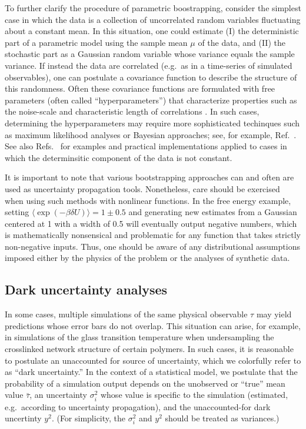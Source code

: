 To further clarify the procedure of parametric boostrapping, consider the simplest case in which the data is a collection of uncorrelated random variables fluctuating about a constant mean.  In this situation, one could estimate (I) the deterministic part of a parametric model using the sample mean $\mu$ of the data, and (II) the stochastic part as a Gaussian random variable whose variance equals the sample variance.  If instead the data are correlated (e.g.\ as in a time-series of simulated observables),  one can postulate a covariance function to describe the structure of this randomness.  Often these covariance functions are formulated with free parameters (often called ``hyperparameters'') that characterize properties such as the noise-scale and characteristic length of correlations \cite{Rasmussen}.  In such cases, determining the hyperparameters may require more sophisticated techinques such as maximum likelihood analyses or Bayesian approaches; see, for example, Ref.~\cite{Rasmussen}.  See also Refs.~\cite{patrone1,patrone2,patrone3,Boettinger2017} for examples and practical implementations applied to cases in which the determinsitic component of the data is not constant.

It is important to note that various bootstrapping approaches can and often are used as uncertainty propagation tools.  Nonetheless, care should be exercised when using such methods with nonlinear functions.  In the free energy example, setting $\langle \exp(-\beta \delta U)\rangle = 1 \pm 0.5$ and generating new estimates from a Gaussian centered at 1 with a width of 0.5 will eventually output negative numbers, which is mathematically nonsensical and problematic for any function that takes strictly non-negative inputs.  Thus, one should be aware of any distributional assumptions imposed either by the physics of the problem or the analyses of synthetic data.


\subsection{Dark uncertainty analyses}

In some cases, multiple simulations of the same physical observable $\tau$ may yield predictions whose error bars do not overlap.  This situation can arise, for example, in simulations of the glass transition temperature when undersampling the crosslinked network structure of certain polymers.  In such cases, it is reasonable to postulate an unaccounted for source of uncertainty, which we colorfully refer to as ``dark uncertainty.''  In the context of a statistical model, we postulate that the probability of a simulation output depends on the unobserved or ``true'' mean value $\bar \tau$, an uncertainty $\sigma_i^2$ whose value is specific to the simulation (estimated, e.g.\ according to uncertainty propagation), and the unaccounted-for dark uncertinty $y^2$.  (For simplicity, the $\sigma_i^2$ and $y^2$ should be treated as variances.)


